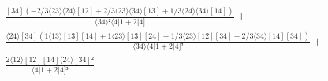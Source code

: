 \documentclass[varwidth, border=5pt]{standalone}
\begin{document}
\begin{my}
$\begin{gathered}
\scriptscriptstyle\frac{[34](-2/3⟨23⟩⟨24⟩[12]+2/3⟨23⟩⟨34⟩[13]+1/3⟨24⟩⟨34⟩[14])}{⟨34⟩²⟨4|1+2|4]} +\\
\scriptscriptstyle\frac{⟨24⟩[34](1⟨13⟩[13][14]+1⟨23⟩[13][24]-1/3⟨23⟩[12][34]-2/3⟨34⟩[14][34])}{⟨34⟩⟨4|1+2|4]²} +\\
\scriptscriptstyle\frac{2⟨12⟩[12][14]⟨24⟩[34]²}{⟨4|1+2|4]³} \phantom{+}
\end{gathered}$
\end{my}
\end{document}

